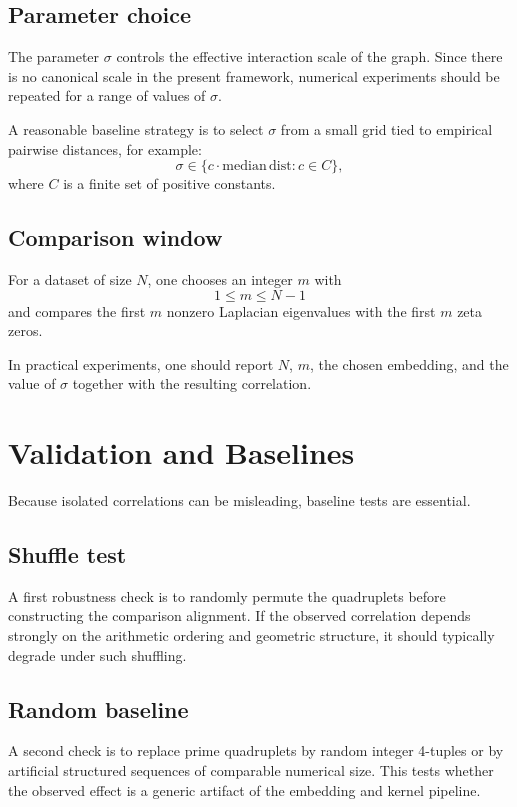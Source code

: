 \documentclass[11pt,a4paper]{article}
\begin{document}
	\subsection{Parameter choice}
	
	The parameter \(\sigma\) controls the effective interaction scale of the graph. Since there is no canonical scale in the present framework, numerical experiments should be repeated for a range of values of \(\sigma\).
	
	A reasonable baseline strategy is to select \(\sigma\) from a small grid tied to empirical pairwise distances, for example:
	\[
	\sigma \in \{c\cdot \mathrm{median\,dist} : c\in C\},
	\]
	where \(C\) is a finite set of positive constants.
	
	\subsection{Comparison window}
	
	For a dataset of size \(N\), one chooses an integer \(m\) with
	\[
	1 \le m \le N-1
	\]
	and compares the first \(m\) nonzero Laplacian eigenvalues with the first \(m\) zeta zeros.
	
	In practical experiments, one should report \(N\), \(m\), the chosen embedding, and the value of \(\sigma\) together with the resulting correlation.
	
	\section{Validation and Baselines}
	
	Because isolated correlations can be misleading, baseline tests are essential.
	
	\subsection{Shuffle test}
	
	A first robustness check is to randomly permute the quadruplets before constructing the comparison alignment. If the observed correlation depends strongly on the arithmetic ordering and geometric structure, it should typically degrade under such shuffling.
	
	\subsection{Random baseline}
	
	A second check is to replace prime quadruplets by random integer 4-tuples or by artificial structured sequences of comparable numerical size. This tests whether the observed effect is a generic artifact of the embedding and kernel pipeline.
	
\end{document}
